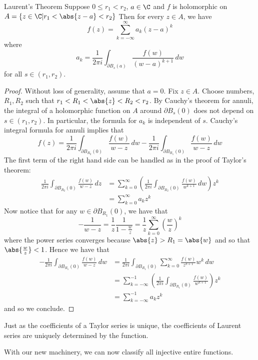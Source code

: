 \documentclass[a4paper]{article}
\begin{document}
\begin{thm}{Laurent's Theorem}{} Suppose $0\leq r_1<r_2$, $a\in\C$ and $f$ is holomorphic on $A=\{z\in\C|r_1<\abs{z-a}<r_2\}$ Then for every $z\in A$, we have $$f(z)=\sum_{k=-\infty}^\infty a_k(z-a)^k$$ where $$a_k=\frac{1}{2\pi i}\int_{\partial B_s(a)}\frac{f(w)}{(w-a)^{k+1}}\,dw$$ for all $s\in(r_1,r_2)$. 
\begin{proof}
Without loss of generality, assume that $a=0$. Fix $z\in A$. Choose numbers, $R_1,R_2$ such that $r_1<R_1<\abs{z}<R_2<r_2$. By Cauchy's theorem for annuli, the integral of a holomorphic function on $A$ around $\partial B_s(0)$ does not depend on $s\in(r_1,r_2)$. In particular, the formula for $a_k$ is independent of $s$. Cauchy's integral formula for annuli implies that $$
f(z)=\frac{1}{2\pi i}\int_{\partial B_{R_2}(0)}\frac{f(w)}{w-z}\,dw-\frac{1}{2\pi i}\int_{\partial B_{R_1}(0)}\frac{f(w)}{w-z}\,dw$$
The first term of the right hand side can be handled as in the proof of Taylor's theorem: 
\begin{align*}
\frac{1}{2\pi i}\int_{\partial B_{R_2}(0)}\frac{f(w)}{w-z}\,dz&=\sum_{k=0}^\infty\left(\frac{1}{2\pi i}\int_{\partial B_{R_2}(0)}\frac{f(w)}{w^{k+1}}\,dw\right)z^k\\
&=\sum_{k=0}^\infty a_kz^k
\end{align*}
Now notice that for any $w\in\partial B_{R_1}(0)$, we have that $$-\frac{1}{w-z}=\frac{1}{z}\frac{1}{1-\frac{w}{z}}=\frac{1}{z}\sum_{k=0}^\infty\left(\frac{w}{z}\right)^k$$ where the power series converges because $\abs{z}>R_1=\abs{w}$ and so that $\abs{\frac{w}{z}}<1$. Hence we have that 
\begin{align*}
-\frac{1}{2\pi i}\int_{\partial B_{R_1}(0)}\frac{f(w)}{w-z}\,dw&=\frac{1}{2\pi i}\int_{\partial B_{R_1}(0)}\sum_{k=0}^\infty\frac{f(w)}{z^{k+1}}w^k\,dw\\
&=\sum_{k=-\infty}^{-1}\left(\frac{1}{2\pi i}\int_{\partial B_{R_1}(0)}\frac{f(w)}{w^{k+1}}\right)z^k\tag{Uniform Convergence}\\
&=\sum_{k=-\infty}^{-1}a_kz^k
\end{align*}
and so we conclude. 
\end{proof}
\end{thm}

Just as the coefficients of a Taylor series is unique, the coefficients of Laurent series are uniquely determined by the function. 

With our new machinery, we can now classify all injective entire functions. 
\end{document}
